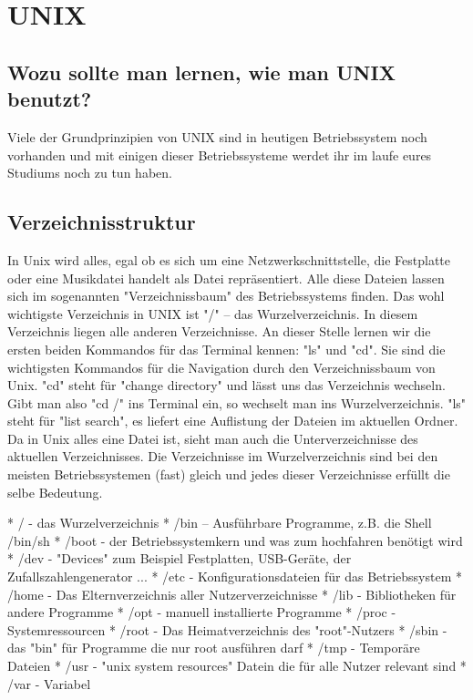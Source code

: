 \section {UNIX}

\subsection {Wozu sollte man lernen, wie man UNIX benutzt?}
Viele der Grundprinzipien von UNIX sind in heutigen Betriebssystem noch vorhanden und mit einigen dieser Betriebssysteme werdet ihr im laufe eures Studiums noch zu tun haben.

\subsection {Verzeichnisstruktur}
In Unix wird alles, egal ob es sich um eine Netzwerkschnittstelle, die Festplatte oder eine Musikdatei handelt als Datei repräsentiert. Alle diese Dateien lassen sich im sogenannten "Verzeichnissbaum" des Betriebssystems finden. Das wohl wichtigste Verzeichnis in UNIX ist "/" – das Wurzelverzeichnis. In diesem Verzeichnis liegen alle anderen Verzeichnisse.
An dieser Stelle lernen wir die ersten beiden Kommandos für das Terminal kennen: "ls" und "cd". Sie sind die wichtigsten Kommandos für die Navigation durch den Verzeichnissbaum von Unix. "cd" steht für "change directory" und lässt uns das Verzeichnis wechseln. Gibt man also "cd /" ins Terminal ein, so wechselt man ins Wurzelverzeichnis. "ls" steht für "list search", es liefert eine Auflistung der Dateien im aktuellen Ordner.
Da in Unix alles eine Datei ist, sieht man auch die Unterverzeichnisse des aktuellen Verzeichnisses.
Die Verzeichnisse im Wurzelverzeichnis sind bei den meisten Betriebssystemen (fast) gleich und jedes dieser Verzeichnisse erfüllt die selbe Bedeutung.

* / - das Wurzelverzeichnis
* /bin – Ausführbare Programme, z.B. die Shell /bin/sh 
* /boot - der Betriebssystemkern und was zum hochfahren benötigt wird
* /dev - "Devices" zum Beispiel Festplatten, USB-Geräte, der Zufallszahlengenerator ...
* /etc - Konfigurationsdateien für das Betriebssystem 
* /home - Das Elternverzeichnis aller Nutzerverzeichnisse
* /lib - Bibliotheken für andere Programme
* /opt - manuell installierte Programme
* /proc - Systemressourcen
* /root - Das Heimatverzeichnis des "root"-Nutzers
* /sbin - das "bin" für Programme die nur root ausführen darf
* /tmp - Temporäre Dateien
* /usr - "unix system resources" Datein die für alle Nutzer relevant sind
* /var - Variabel

